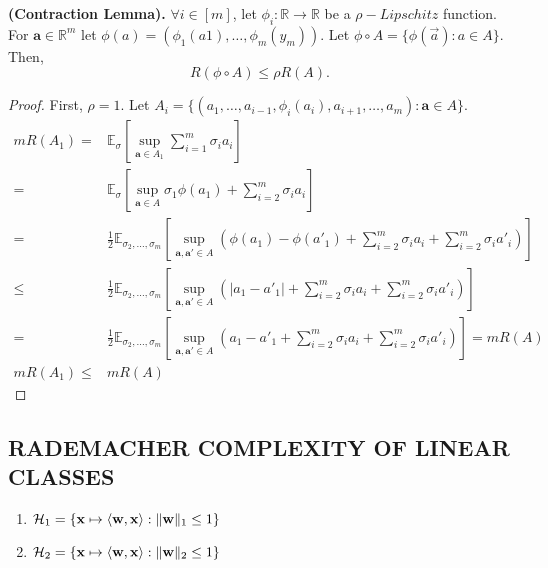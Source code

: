 \begin{lemma}
    \textbf{(Contraction Lemma).}
    $ \forall i \in [m] $, let $ \phi_i: \mathbb{R} \rightarrow \mathbb{R} $ be a $ \rho-Lipschitz $ function.
    For $ \mathbf{a} \in \mathbb{R}^m $ let $ \phi(a) = (\phi_1(a1), \ldots, \phi_m(y_m)) $.
    Let $ \phi \circ A = \{ \phi(\vec a) : a \in A \} $. Then,
    \[
        R(\phi \circ A) \le \rho R(A).
    \]
    \begin{proof}
        First, $ \rho = 1 $.
        Let $ A_i = \{ (a_1, \ldots, a_{i-1}, \phi_i(a_i), a_{i+1}, \ldots, a_m) : \mathbf{a} \in A \} $.
        \begin{align*}
            mR(A_1) =& \mathbb{E}_{\sigma} \left[ \sup_{\mathbf{a} \in A_1} \sum^{m}_{i=1} \sigma_i a_i \right]\\
            =& \mathbb{E}_{\sigma} \left[ \sup_{\mathbf{a} \in A} \sigma_1 \phi(a_1) + \sum^{m}_{i=2} \sigma_i a_i \right]\\
            =& \frac{1}{2} \mathbb{E}_{\sigma_2, \ldots, \sigma_m}
            \left[ \sup_{\mathbf{a,a'} \in A} \left( \phi(a_1) - \phi(a'_1) + \sum^{m}_{i=2} \sigma_i a_i + \sum^{m}_{i=2} \sigma_i a'_i \right) \right] \\
            \le& \frac{1}{2} \mathbb{E}_{\sigma_2, \ldots, \sigma_m}
            \left[ \sup_{\mathbf{a,a'} \in A} \left( | a_1 - a'_1 | + \sum^{m}_{i=2} \sigma_i a_i + \sum^{m}_{i=2} \sigma_i a'_i \right) \right] \\
            =& \frac{1}{2} \mathbb{E}_{\sigma_2, \ldots, \sigma_m}
            \left[ \sup_{\mathbf{a,a'} \in A} \left( a_1 - a'_1 + \sum^{m}_{i=2} \sigma_i a_i + \sum^{m}_{i=2} \sigma_i a'_i \right) \right] = m R(A) \\
            mR(A_1) \le& mR(A)
        \end{align*}
    \end{proof}
\end{lemma}

\subsection{RADEMACHER COMPLEXITY OF LINEAR CLASSES}%
\label{sub:rademacher_complexity_of_linear_classes}
\begin{enumerate}
    \item $ \mathcal{H}_1 = \{ \mathbf{x} \mapsto \langle \mathbf{w}, \mathbf{x} \rangle : \Arrowvert \mathbf{w} \Arrowvert_1 \le 1 \} $ 
    \item $ \mathcal{H}_2 = \{ \mathbf{x} \mapsto \langle \mathbf{w}, \mathbf{x} \rangle : \Arrowvert \mathbf{w} \Arrowvert_2 \le 1 \} $ 
\end{enumerate}

